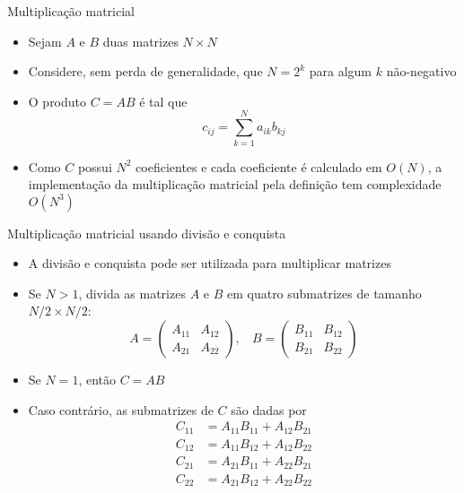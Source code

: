 \begin{frame}[fragile]{Multiplicação matricial}

    \begin{itemize}
        \item Sejam $A$ e $B$ duas matrizes $N\times N$

        \item Considere, sem perda de generalidade, que $N = 2^k$ para algum $k$ não-negativo

        \item O produto $C = AB$ é tal que
        \[
            c_{ij} = \sum_{k = 1}^N a_{ik}b_{kj}
        \]

        \item Como $C$ possui $N^2$ coeficientes e cada coeficiente é calculado em $O(N)$, a
            implementação da multiplicação matricial pela definição tem complexidade $O(N^3)$
    \end{itemize}


\end{frame}

\begin{frame}[fragile]{Multiplicação matricial usando divisão e conquista}

    \begin{itemize}
        \item A divisão e conquista pode ser utilizada para multiplicar matrizes

        \item Se $N > 1$, divida as matrizes $A$ e $B$ em quatro submatrizes de tamanho $N/2 \times
            N/2$:
        \[
            A = \begin{pmatrix}
                    A_{11} & A_{12} \\
                    A_{21} & A_{22}
                \end{pmatrix}, \ \ \ \ 
            B = \begin{pmatrix}
                    B_{11} & B_{12} \\
                    B_{21} & B_{22}
                \end{pmatrix}
        \]

        \item Se $N = 1$, então $C = AB$

        \item Caso contrário, as submatrizes de $C$ são dadas por
        \begin{align*}
            C_{11} &= A_{11}B_{11} + A_{12}B_{21} \\
            C_{12} &= A_{11}B_{12} + A_{12}B_{22} \\
            C_{21} &= A_{21}B_{11} + A_{22}B_{21} \\
            C_{22} &= A_{21}B_{12} + A_{22}B_{22}
        \end{align*}
            
    \end{itemize}

\end{frame}


